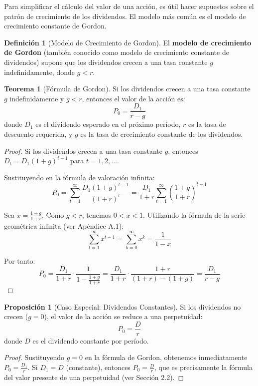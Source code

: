 \documentclass[12pt,a4paper]{article}
\theoremstyle{definition}
\newtheorem{definicion}{Definición}[section]
\newtheorem{teorema}{Teorema}[section]
\newtheorem{proposicion}{Proposición}[section]
\begin{document}
Para simplificar el cálculo del valor de una acción, es útil hacer supuestos sobre el patrón de crecimiento de los dividendos. El modelo más común es el modelo de crecimiento constante de Gordon.

\begin{definicion}[Modelo de Crecimiento de Gordon]
El \textbf{modelo de crecimiento de Gordon} (también conocido como modelo de crecimiento constante de dividendos) supone que los dividendos crecen a una tasa constante $g$ indefinidamente, donde $g < r$.
\end{definicion}

\begin{teorema}[Fórmula de Gordon]
Si los dividendos crecen a una tasa constante $g$ indefinidamente y $g < r$, entonces el valor de la acción es:
\begin{equation}
P_0 = \frac{D_1}{r - g}
\end{equation}
donde $D_1$ es el dividendo esperado en el próximo período, $r$ es la tasa de descuento requerida, y $g$ es la tasa de crecimiento constante de los dividendos.
\end{teorema}

\begin{proof}
Si los dividendos crecen a una tasa constante $g$, entonces $D_t = D_1(1+g)^{t-1}$ para $t = 1, 2, \ldots$.

Sustituyendo en la fórmula de valoración infinita:
$$P_0 = \sum_{t=1}^{\infty} \frac{D_1(1+g)^{t-1}}{(1+r)^t} = \frac{D_1}{1+r} \sum_{t=1}^{\infty} \left(\frac{1+g}{1+r}\right)^{t-1}$$

Sea $x = \frac{1+g}{1+r}$. Como $g < r$, tenemos $0 < x < 1$. Utilizando la fórmula de la serie geométrica infinita (ver Apéndice A.1):
$$\sum_{t=1}^{\infty} x^{t-1} = \sum_{k=0}^{\infty} x^k = \frac{1}{1-x}$$

Por tanto:
$$P_0 = \frac{D_1}{1+r} \cdot \frac{1}{1 - \frac{1+g}{1+r}} = \frac{D_1}{1+r} \cdot \frac{1+r}{(1+r) - (1+g)} = \frac{D_1}{r - g}$$
\end{proof}

\begin{proposicion}[Caso Especial: Dividendos Constantes]
Si los dividendos no crecen ($g = 0$), el valor de la acción se reduce a una perpetuidad:
\begin{equation}
P_0 = \frac{D}{r}
\end{equation}
donde $D$ es el dividendo constante por período.
\end{proposicion}

\begin{proof}
Sustituyendo $g = 0$ en la fórmula de Gordon, obtenemos inmediatamente $P_0 = \frac{D_1}{r}$. Si $D_1 = D$ (constante), entonces $P_0 = \frac{D}{r}$, que es precisamente la fórmula del valor presente de una perpetuidad (ver Sección 2.2).
\end{proof}
\end{document}
